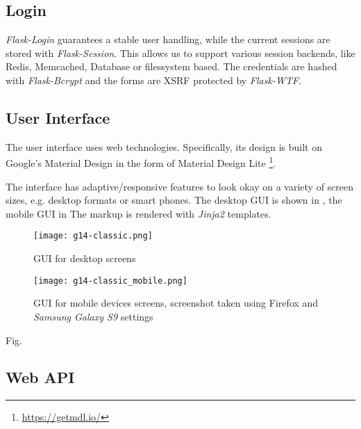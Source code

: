 \subsection{Login}
\label{gXLII:sec:implementation:login}  %
\textit{Flask-Login} guarantees a stable user handling, while the current sessions are stored with \textit{Flask-Session}. This allows us to support various session backends, like Redis, Memcached, Database or filessystem based. The credentials are hashed with \textit{Flask-Bcrypt} and the forms are XSRF protected by \textit{Flask-WTF}. 

\subsection{User Interface}
\label{gXLII:sec:implementation:UI}  %

The user interface uses web technologies. Specifically, its design is built on Google's Material Design in the form of Material Design Lite \footnote{\url{https://getmdl.io/}}.

The interface has adaptive/responsive features to look okay on a variety of screen sizes, e.g. desktop formats or smart phones. The desktop GUI is shown in , the mobile GUI in 
The markup is rendered with \textit{Jinja2} templates.




\begin{figure}[tb]
\centering
\texttt{[image: g14-classic.png]}
\caption{GUI for desktop screens}
\label{fig:guiclassicdesktop}
\end{figure}


\begin{figure}[tb]
\centering
\texttt{[image: g14-classic\_mobile.png]}
\caption{GUI for mobile devices screens, screenshot taken using Firefox and \textit{Samsung Galaxy S9} settings}
\label{fig:guiclassicmobile}
\end{figure}

Fig. 


\subsection{Web API}
\label{gXLII:sec:implementation:API}  %




